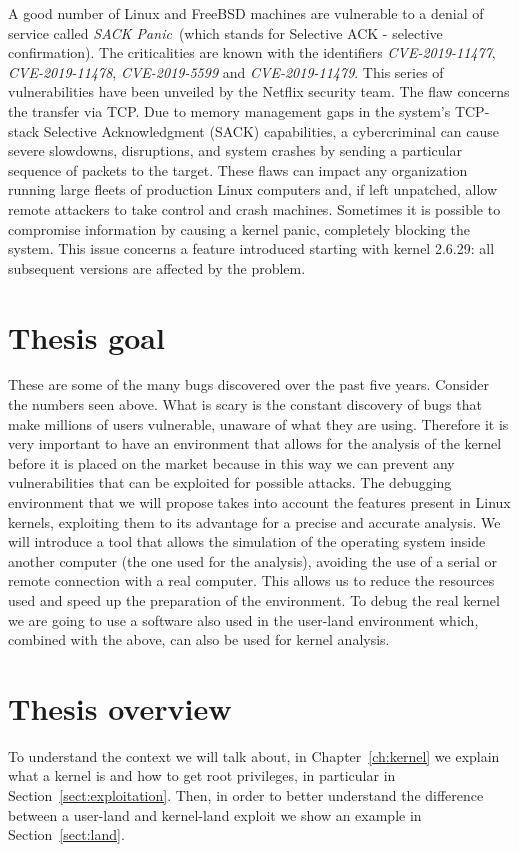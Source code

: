 \documentclass{masterthesis}
\newcommand{\refToChapter}[1]{Chapter~\ref{ch:#1}\xspace}
\newcommand{\refToSection}[1]{Section~\ref{sect:#1}\xspace}
\begin{document}
A good number of Linux and FreeBSD machines are vulnerable to a denial of service called \emph{SACK Panic}~\cite{shitwo}(which stands for Selective ACK - selective confirmation). The criticalities are known with the identifiers \textit{CVE-2019-11477}, \textit{CVE-2019-11478}, \textit{CVE-2019-5599} and \textit{CVE-2019-11479}.
This series of vulnerabilities have been unveiled by the Netflix security team.
The flaw concerns the transfer via TCP. Due to memory management gaps in the system's TCP-stack Selective Acknowledgment (SACK) capabilities, a cybercriminal can cause severe slowdowns, disruptions, and system crashes by sending a particular sequence of packets to the target.
These flaws can impact any organization running large fleets of production Linux computers and, if left unpatched, allow remote attackers to take control and crash machines.
Sometimes it is possible to compromise information by causing a kernel panic, completely blocking the system. This issue concerns a feature introduced starting with kernel 2.6.29: all subsequent versions are affected by the problem.

\section{Thesis goal}
These are some of the many bugs discovered over the past five years. Consider the numbers seen above. What is scary is the constant discovery of bugs that make millions of users vulnerable, unaware of what they are using.
Therefore it is very important to have an environment that allows for the analysis of the kernel before it is placed on the market because in this way we can prevent any vulnerabilities that can be exploited for possible attacks.
The debugging environment that we will propose takes into account the features present in Linux kernels, exploiting them to its advantage for a precise and accurate analysis. 
We will introduce a tool that allows the simulation of the operating system inside another computer (the one used for the analysis), avoiding the use of a serial or remote connection with a real computer. This allows us to reduce the resources used and speed up the preparation of the environment.
To debug the real kernel we are going to use a software also used in the user-land environment which, combined with the above, can also be used for kernel analysis.

\section{Thesis overview}
To understand the context we will talk about, in \refToChapter{kernel} we explain what a kernel is and how to get root privileges, in particular in \refToSection{exploitation}. Then, in order to better understand the difference between a user-land and kernel-land exploit we show an example in \refToSection{land}.
\end{document}
